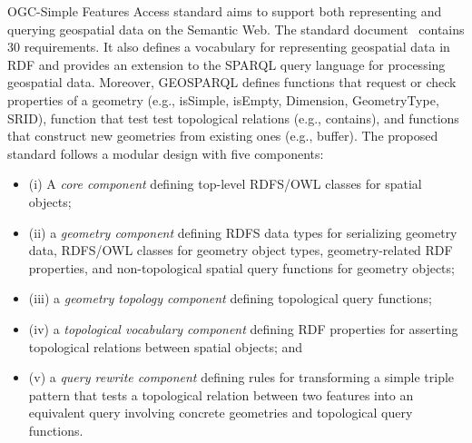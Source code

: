 OGC-Simple Features Access standard aims to support both representing and querying geospatial data on the Semantic Web. The standard document~\cite{ogc2012} contains 30 requirements. It also defines a vocabulary for representing geospatial data in RDF and provides an extension to the SPARQL query language for processing geospatial data. 
Moreover, GEOSPARQL defines functions that request or check properties of a geometry (e.g., isSimple, isEmpty, Dimension, GeometryType, SRID), function that test test topological relations (e.g., contains),
and functions that construct new geometries from existing ones (e.g., buffer). 
 The proposed standard follows a modular design with five components: 
\begin{itemize}
\item (i) A \textit{core component} defining top-level RDFS/OWL classes for spatial objects; 
\item (ii) a \textit{geometry component} defining RDFS data types for serializing geometry data, RDFS/OWL classes for geometry object types, geometry-related RDF properties, and non-topological spatial query functions for geometry objects; 
\item (iii) a \textit{geometry topology component} defining topological query functions; 
\item (iv) a \textit{topological vocabulary component} defining RDF properties for asserting topological relations between spatial objects; and 
\item (v) a \textit{query rewrite component} defining rules for transforming a simple triple pattern that tests a topological relation between two features into an equivalent query involving concrete geometries and topological query functions.
\end{itemize}

